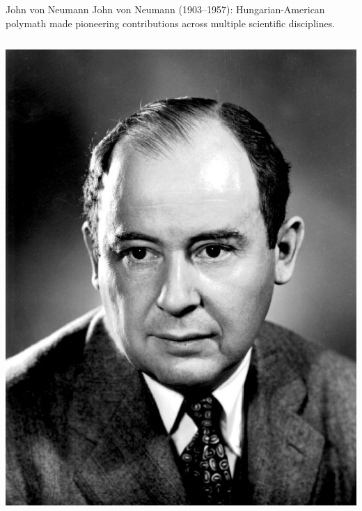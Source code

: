 \begin{frame}{John von Neumann}
\small
John von Neumann (1903–1957): Hungarian-American polymath  made pioneering contributions across multiple scientific disciplines. 
    \begin{columns}
            \includegraphics[width=\textwidth]{lesson_4/images/von_neumann.jpg} 
            
            \scriptsize
            

\end{columns}
\end{frame}
